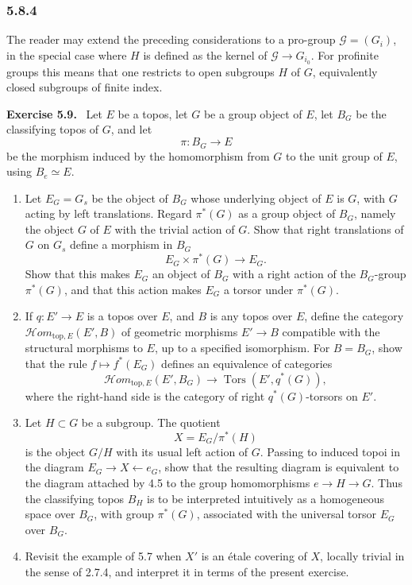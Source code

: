 \documentclass[11pt]{article}
\newcommand{\Ttors}{\operatorname{Tors}}
\newenvironment{remarktext}[1]{\par\medskip\noindent\textbf{#1.}\ }{\par\medskip}
\providecommand{\Ttors}{\operatorname{Tors}}
\begin{document}
\subsubsection*{5.8.4}
The reader may extend the preceding considerations to a pro-group \(\mathcal G=(G_i)\), in the special case where \(H\) is defined as the kernel of \(\mathcal G\to G_{i_0}\). For profinite groups this means that one restricts to open subgroups \(H\) of \(G\), equivalently closed subgroups of finite index.

\begin{remarktext}{Exercise 5.9}
Let \(E\) be a topos, let \(G\) be a group object of \(E\), let \(B_G\) be the classifying topos of \(G\), and let
\[
\pi:B_G\longrightarrow E
\]
be the morphism induced by the homomorphism from \(G\) to the unit group of \(E\), using \(B_e\simeq E\).
\begin{enumerate}[label=\alph*)]
\item Let \(E_G=G_s\) be the object of \(B_G\) whose underlying object of \(E\) is \(G\), with \(G\) acting by left translations. Regard \(\pi^*(G)\) as a group object of \(B_G\), namely the object \(G\) of \(E\) with the trivial action of \(G\). Show that right translations of \(G\) on \(G_s\) define a morphism in \(B_G\)
\[
E_G\times\pi^*(G)\longrightarrow E_G.
\]
Show that this makes \(E_G\) an object of \(B_G\) with a right action of the \(B_G\)-group \(\pi^*(G)\), and that this action makes \(E_G\) a torsor under \(\pi^*(G)\).

\item If \(q:E'\to E\) is a topos over \(E\), and \(B\) is any topos over \(E\), define the category \(\mathcal{H}om_{\mathrm{top},E}(E',B)\) of geometric morphisms \(E'\to B\) compatible with the structural morphisms to \(E\), up to a specified isomorphism. For \(B=B_G\), show that the rule \(f\mapsto f^*(E_G)\) defines an equivalence of categories
\[
\mathcal{H}om_{\mathrm{top},E}(E',B_G)\longrightarrow \Ttors(E',q^*(G)),
\]
where the right-hand side is the category of right \(q^*(G)\)-torsors on \(E'\).

\item Let \(H\subset G\) be a subgroup. The quotient
\[
X=E_G/\pi^*(H)
\]
is the object \(G/H\) with its usual left action of \(G\). Passing to induced topoi in the diagram \(E_G\to X\leftarrow e_G\), show that the resulting diagram is equivalent to the diagram attached by 4.5 to the group homomorphisms \(e\to H\to G\). Thus the classifying topos \(B_H\) is to be interpreted intuitively as a homogeneous space over \(B_G\), with group \(\pi^*(G)\), associated with the universal torsor \(E_G\) over \(B_G\).

\item Revisit the example of 5.7 when \(X'\) is an \'etale covering of \(X\), locally trivial in the sense of 2.7.4, and interpret it in terms of the present exercise.
\end{enumerate}
\end{remarktext}
\end{document}
